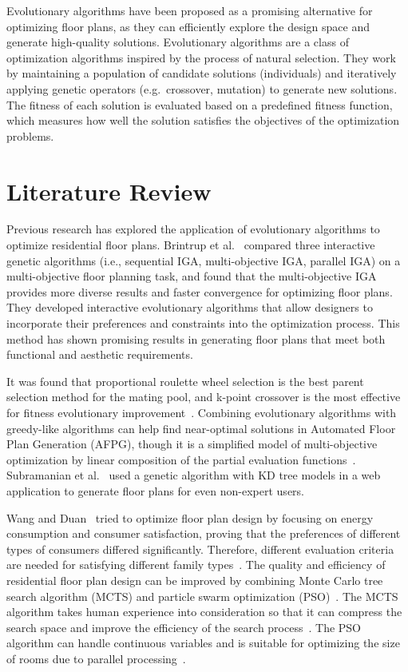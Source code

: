 \documentclass[]{article}
\begin{document}
Evolutionary algorithms have been proposed as a promising alternative for optimizing floor plans, as they can efficiently explore the design space and generate high-quality solutions. Evolutionary algorithms are a class of optimization algorithms inspired by the process of natural selection. They work by maintaining a population of candidate solutions (individuals) and iteratively applying genetic operators (e.g.\ crossover, mutation) to generate new solutions. The fitness of each solution is evaluated based on a predefined fitness function, which measures how well the solution satisfies the objectives of the optimization problems.

\section{Literature Review}
Previous research has explored the application of evolutionary algorithms to optimize residential floor plans. Brintrup et al.~\cite{10.1007/11732242_56} compared three interactive genetic algorithms (i.e., sequential IGA, multi-objective IGA, parallel IGA) on a multi-objective floor planning task, and found that the multi-objective IGA provides more diverse results and faster convergence for optimizing floor plans. They developed interactive evolutionary algorithms that allow designers to incorporate their preferences and constraints into the optimization process. This method has shown promising results in generating floor plans that meet both functional and aesthetic requirements.

It was found that proportional roulette wheel selection is the best parent selection method for the mating pool, and k-point crossover is the most effective for fitness evolutionary improvement~\cite{7844659}.
Combining evolutionary algorithms with greedy-like algorithms can help find near-optimal solutions in Automated Floor Plan Generation (AFPG), though it is a simplified model of multi-objective optimization by linear composition of the partial evaluation functions~\cite{doi:10.1177/1478077119832982}. Subramanian et al.~\cite{9675541} used a genetic algorithm with KD tree models in a web application to generate floor plans for even non-expert users.

Wang and Duan~\cite{WANG2023100238} tried to optimize floor plan design by focusing on energy consumption and consumer satisfaction, proving that the preferences of different types of consumers differed significantly. Therefore, different evaluation criteria are needed for satisfying different family types~\cite{WANG2023100238}. The quality and efficiency of residential floor plan design can be improved by combining Monte Carlo tree search algorithm (MCTS) and particle swarm optimization (PSO)~\cite{YAN2024110546}. The MCTS algorithm takes human experience into consideration so that it can compress the search space and improve the efficiency of the search process~\cite{YAN2024110546}. The PSO algorithm can handle continuous variables and is suitable for optimizing the size of rooms due to parallel processing~\cite{YAN2024110546}.
\end{document}
